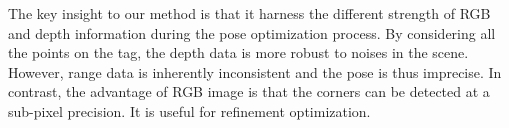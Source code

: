The key insight to our method is that it harness the different strength of RGB and depth information during the pose optimization process. By considering all the points on the tag, the depth data is more robust to noises in the scene. However, range data is inherently inconsistent and the pose is thus imprecise. In contrast, the advantage of RGB image is that the corners can be detected at a sub-pixel precision. It is useful for refinement optimization.  